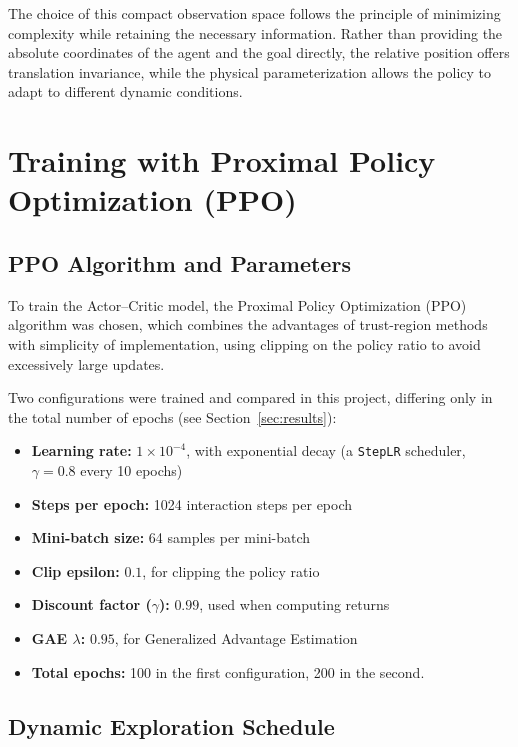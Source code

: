\documentclass[11pt]{article}
\begin{document}
The choice of this compact observation space follows the principle of minimizing complexity while
retaining the necessary information. Rather than providing the absolute coordinates of the agent and the
goal directly, the relative position offers translation invariance, while the physical parameterization
allows the policy to adapt to different dynamic conditions.

\section{Training with Proximal Policy Optimization (PPO)}

\subsection{PPO Algorithm and Parameters}

To train the Actor--Critic model, the Proximal Policy Optimization (PPO) algorithm was chosen, which
combines the advantages of trust-region methods with simplicity of implementation, using clipping on the
policy ratio to avoid excessively large updates.

Two configurations were trained and compared in this project, differing only in the total number of
epochs (see Section~\ref{sec:results}):

\begin{itemize}
  \item \textbf{Learning rate:} $1\times10^{-4}$, with exponential decay (a \texttt{StepLR} scheduler,
  $\gamma=0.8$ every 10 epochs)
  \item \textbf{Steps per epoch:} 1024 interaction steps per epoch
  \item \textbf{Mini-batch size:} 64 samples per mini-batch
  \item \textbf{Clip epsilon:} $0.1$, for clipping the policy ratio
  \item \textbf{Discount factor ($\gamma$):} $0.99$, used when computing returns
  \item \textbf{GAE $\lambda$:} $0.95$, for Generalized Advantage Estimation
  \item \textbf{Total epochs:} 100 in the first configuration, 200 in the second.
\end{itemize}

\subsection{Dynamic Exploration Schedule}
\end{document}
